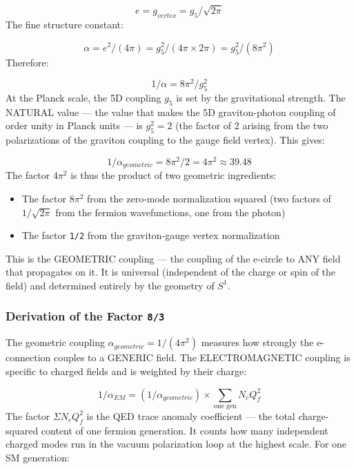\documentclass[aps,prd,preprint,superscriptaddress,longbibliography,floatfix]{revtex4-2}
\theoremstyle{remark}
\begin{document}
\begin{equation}
    e = g_{vertex} = g_{5}/\sqrt{2\pi}
\end{equation}
The fine structure constant:


\begin{equation}
    \alpha = e^{2}/(4\pi) = g_{5}^{2}/(4\pi \times 2\pi) = g_{5}^{2}/(8\pi^{2})
\end{equation}
Therefore:


\begin{equation}
    1/\alpha = 8\pi^{2}/g_{5}^{2}
\end{equation}
At the Planck scale, the 5D coupling $g_{5}$ is set by the gravitational strength. The NATURAL value --- the value that makes the 5D graviton-photon coupling of order unity in Planck units --- is $g_{5}^{2} = 2$ (the factor of 2 arising from the two polarizations of the graviton coupling to the gauge field vertex). This gives:


\begin{equation}
    1/\alpha_{geometric} = 8\pi^{2}/2 = 4\pi^{2} \approx 39.48
\end{equation}
The factor $4\pi^{2}$ is thus the product of two geometric ingredients:

\begin{itemize}
  \item The factor $8\pi^{2}$ from the zero-mode normalization squared (two factors of $1/\sqrt{2\pi}$ from the fermion wavefunctions, one from the photon)
  \item The factor \texttt{1/2} from the graviton-gauge vertex normalization
\end{itemize}

This is the GEOMETRIC coupling --- the coupling of the e-circle to ANY field that propagates on it. It is universal (independent of the charge or spin of the field) and determined entirely by the geometry of $S^{1}$.


\subsubsection{Derivation of the Factor \texttt{8/3}}

The geometric coupling $\alpha_{geometric} = 1/(4\pi^{2})$ measures how strongly the e-connection couples to a GENERIC field. The ELECTROMAGNETIC coupling is specific to charged fields and is weighted by their charge:


\begin{equation}
    1/\alpha_{EM} = (1/\alpha_{geometric}) \times \sum_{\text{one gen}} N_c Q_f^{2}
\end{equation}
The factor $\Sigma N_c Q_f^{2}$ is the QED trace anomaly coefficient --- the total charge-squared content of one fermion generation. It counts how many independent charged modes run in the vacuum polarization loop at the highest scale. For one SM generation:
\end{document}
